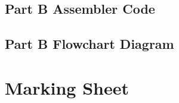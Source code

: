 \documentclass[letterpaper]{article}
\begin{document}
  \subsection{Part B Assembler Code}
    
\newpage

  \subsection{Part B Flowchart Diagram}
  \vspace{2cm}
    \noindent{}
\newpage

\section{Marking Sheet}
\end{document}
